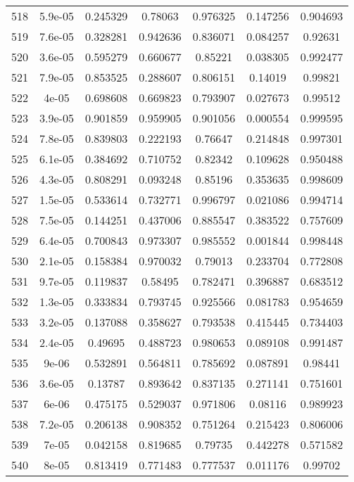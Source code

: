 \begin{table}
\begin{tabular}{c|c|c|c|c|c|c}
518 & 5.9e-05 & 0.245329 & 0.78063 & 0.976325 & 0.147256 & 0.904693\\
519 & 7.6e-05 & 0.328281 & 0.942636 & 0.836071 & 0.084257 & 0.92631\\
520 & 3.6e-05 & 0.595279 & 0.660677 & 0.85221 & 0.038305 & 0.992477\\
521 & 7.9e-05 & 0.853525 & 0.288607 & 0.806151 & 0.14019 & 0.99821\\
522 & 4e-05 & 0.698608 & 0.669823 & 0.793907 & 0.027673 & 0.99512\\
523 & 3.9e-05 & 0.901859 & 0.959905 & 0.901056 & 0.000554 & 0.999595\\
524 & 7.8e-05 & 0.839803 & 0.222193 & 0.76647 & 0.214848 & 0.997301\\
525 & 6.1e-05 & 0.384692 & 0.710752 & 0.82342 & 0.109628 & 0.950488\\
526 & 4.3e-05 & 0.808291 & 0.093248 & 0.85196 & 0.353635 & 0.998609\\
527 & 1.5e-05 & 0.533614 & 0.732771 & 0.996797 & 0.021086 & 0.994714\\
528 & 7.5e-05 & 0.144251 & 0.437006 & 0.885547 & 0.383522 & 0.757609\\
529 & 6.4e-05 & 0.700843 & 0.973307 & 0.985552 & 0.001844 & 0.998448\\
530 & 2.1e-05 & 0.158384 & 0.970032 & 0.79013 & 0.233704 & 0.772808\\
531 & 9.7e-05 & 0.119837 & 0.58495 & 0.782471 & 0.396887 & 0.683512\\
532 & 1.3e-05 & 0.333834 & 0.793745 & 0.925566 & 0.081783 & 0.954659\\
533 & 3.2e-05 & 0.137088 & 0.358627 & 0.793538 & 0.415445 & 0.734403\\
534 & 2.4e-05 & 0.49695 & 0.488723 & 0.980653 & 0.089108 & 0.991487\\
535 & 9e-06 & 0.532891 & 0.564811 & 0.785692 & 0.087891 & 0.98441\\
536 & 3.6e-05 & 0.13787 & 0.893642 & 0.837135 & 0.271141 & 0.751601\\
537 & 6e-06 & 0.475175 & 0.529037 & 0.971806 & 0.08116 & 0.989923\\
538 & 7.2e-05 & 0.206138 & 0.908352 & 0.751264 & 0.215423 & 0.806006\\
539 & 7e-05 & 0.042158 & 0.819685 & 0.79735 & 0.442278 & 0.571582\\
540 & 8e-05 & 0.813419 & 0.771483 & 0.777537 & 0.011176 & 0.99702\\
\end{tabular}
\end{table}
